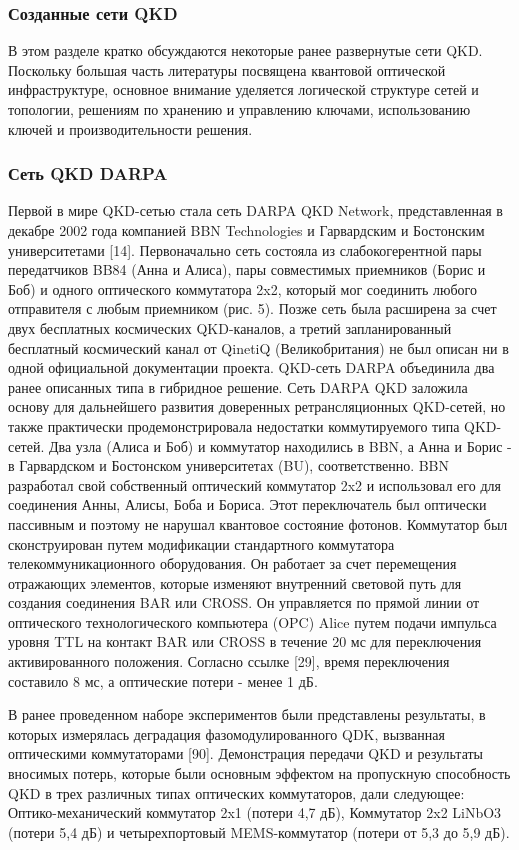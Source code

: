 \subsubsection{Созданные сети QKD}
В этом разделе кратко обсуждаются некоторые ранее развернутые сети QKD. Поскольку большая часть литературы посвящена квантовой оптической инфраструктуре, основное внимание уделяется логической структуре сетей и топологии, решениям по хранению и управлению ключами, использованию ключей и производительности решения.
\subsubsection{Сеть QKD DARPA}
Первой в мире QKD-сетью стала сеть DARPA QKD Network, представленная в декабре 2002 года компанией BBN Technologies и Гарвардским и Бостонским университетами [14]. Первоначально сеть состояла из слабокогерентной пары передатчиков BB84 (Анна и Алиса), пары совместимых приемников (Борис и Боб) и одного оптического коммутатора 2x2, который мог соединить любого отправителя с любым приемником (рис. 5). Позже сеть была расширена за счет двух бесплатных космических QKD-каналов, а третий запланированный бесплатный космический канал от QinetiQ (Великобритания) не был описан ни в одной официальной документации проекта. QKD-сеть DARPA объединила два ранее описанных типа в гибридное решение. Сеть DARPA QKD заложила основу для дальнейшего развития доверенных ретрансляционных QKD-сетей, но также практически продемонстрировала недостатки коммутируемого типа QKD-сетей.
Два узла (Алиса и Боб) и коммутатор находились в BBN, а Анна и Борис - в Гарвардском и Бостонском университетах (BU), соответственно. BBN разработал свой собственный оптический коммутатор 2x2 и использовал его для соединения Анны, Алисы, Боба и Бориса. Этот переключатель был оптически пассивным и поэтому не нарушал квантовое состояние фотонов. Коммутатор был сконструирован путем модификации стандартного коммутатора телекоммуникационного оборудования. Он работает за счет перемещения отражающих элементов, которые изменяют внутренний световой путь для создания соединения BAR или CROSS. Он управляется по прямой линии от оптического технологического компьютера (OPC) Alice путем подачи импульса уровня TTL на контакт BAR или CROSS в течение 20 мс для переключения активированного положения. Согласно ссылке [29], время переключения составило 8 мс, а оптические потери - менее 1 дБ.

В ранее проведенном наборе экспериментов были представлены результаты, в которых измерялась деградация фазомодулированного QDK, вызванная оптическими коммутаторами [90]. Демонстрация передачи QKD и результаты вносимых потерь, которые были основным эффектом на пропускную способность QKD в трех различных типах оптических коммутаторов, дали следующее: Оптико-механический коммутатор 2x1 (потери 4,7 дБ),
Коммутатор 2x2 LiNbO3 (потери 5,4 дБ) и четырехпортовый MEMS-коммутатор (потери от 5,3 до 5,9 дБ).

